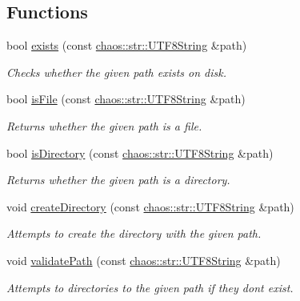 \subsection*{Functions}
\begin{DoxyCompactItemize}
\item 
bool \hyperlink{namespacechaos_1_1file_adf7e73537e98788dd40ddf806d3b55be}{exists} (const \hyperlink{classchaos_1_1str_1_1_u_t_f8_string}{chaos\+::str\+::\+U\+T\+F8\+String} \&path)
\begin{DoxyCompactList}\small\item\em Checks whether the given path exists on disk. \end{DoxyCompactList}\item 
bool \hyperlink{namespacechaos_1_1file_ac6aba245865040dcd1bd17e7ca82713d}{is\+File} (const \hyperlink{classchaos_1_1str_1_1_u_t_f8_string}{chaos\+::str\+::\+U\+T\+F8\+String} \&path)
\begin{DoxyCompactList}\small\item\em Returns whether the given path is a file. \end{DoxyCompactList}\item 
bool \hyperlink{namespacechaos_1_1file_afb64377863f9ea4cb0497a341b1858b1}{is\+Directory} (const \hyperlink{classchaos_1_1str_1_1_u_t_f8_string}{chaos\+::str\+::\+U\+T\+F8\+String} \&path)
\begin{DoxyCompactList}\small\item\em Returns whether the given path is a directory. \end{DoxyCompactList}\item 
\hypertarget{namespacechaos_1_1file_ada4414852f3aab926d28955930fb03ff}{}void \hyperlink{namespacechaos_1_1file_ada4414852f3aab926d28955930fb03ff}{create\+Directory} (const \hyperlink{classchaos_1_1str_1_1_u_t_f8_string}{chaos\+::str\+::\+U\+T\+F8\+String} \&path)\label{namespacechaos_1_1file_ada4414852f3aab926d28955930fb03ff}

\begin{DoxyCompactList}\small\item\em Attempts to create the directory with the given path. \end{DoxyCompactList}\item 
void \hyperlink{namespacechaos_1_1file_aea03a5eedcd2c4039bbc25d57eed4f8b}{validate\+Path} (const \hyperlink{classchaos_1_1str_1_1_u_t_f8_string}{chaos\+::str\+::\+U\+T\+F8\+String} \&path)
\begin{DoxyCompactList}\small\item\em Attempts to directories to the given path if they don\textquotesingle{}t exist. \end{DoxyCompactList}\end{DoxyCompactItemize}


